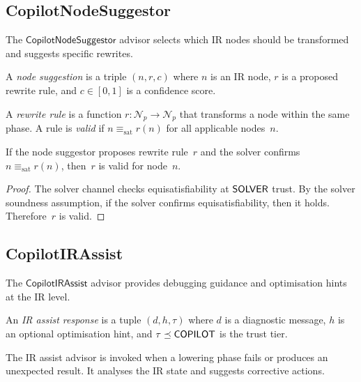 \documentclass[11pt]{article}
\newcommand{\NodeSugg}{\mathsf{CopilotNodeSuggestor}}
\newcommand{\IRAssist}{\mathsf{CopilotIRAssist}}
\begin{document}
\subsection{CopilotNodeSuggestor}

The $\NodeSugg$ advisor selects which IR nodes should be
transformed and suggests specific rewrites.

\begin{definition}\label{def:nodesugg}
A \emph{node suggestion} is a triple $(n, r, c)$ where
$n$ is an IR node, $r$ is a proposed rewrite rule, and
$c \in [0,1]$ is a confidence score.
\end{definition}

\begin{definition}\label{def:rewriterule}
A \emph{rewrite rule} is a function
$r \colon \mathcal{N}_p \to \mathcal{N}_p$ that transforms
a node within the same phase.  A rule is \emph{valid} if
$n \equiv_{\mathrm{sat}} r(n)$ for all applicable nodes~$n$.
\end{definition}

\begin{lemma}\label{lem:nodesuggsound}
If the node suggestor proposes rewrite rule~$r$ and the
solver confirms $n \equiv_{\mathrm{sat}} r(n)$, then~$r$
is valid for node~$n$.
\end{lemma}
\begin{proof}
The solver channel checks equisatisfiability at $\mathsf{SOLVER}$
trust.  By the solver soundness assumption, if the solver
confirms equisatisfiability, then it holds.  Therefore~$r$
is valid.
\end{proof}

\subsection{CopilotIRAssist}

The $\IRAssist$ advisor provides debugging guidance and
optimisation hints at the IR level.

\begin{definition}\label{def:irassist}
An \emph{IR assist response} is a tuple
$(d, h, \tau)$ where $d$ is a diagnostic message,
$h$ is an optional optimisation hint, and $\tau \preceq
\mathsf{COPILOT}$ is the trust tier.
\end{definition}

The IR assist advisor is invoked when a lowering phase
fails or produces an unexpected result.  It analyses the
IR state and suggests corrective actions.
\end{document}
